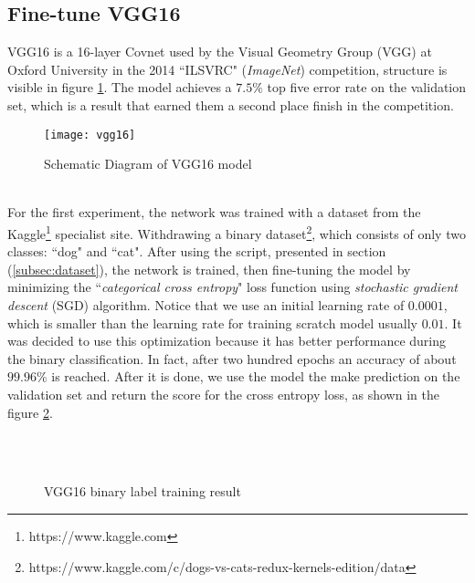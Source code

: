 \subsection{Fine-tune VGG16} 
\label{subsec:vgg16}
VGG16 is a 16-layer Covnet used by the Visual Geometry Group (VGG) at Oxford 
University in the 2014 ``ILSVRC" (\emph{ImageNet}) competition,
structure is visible in figure \ref{fig:vgg16schema}. 
The model achieves a $7.5\%$ top five error rate on the validation set, which 
is a result that earned them a second place finish in the competition.\linebreak
%
\begin{figure}[htb]
\centering
\texttt{[image: vgg16]}
\caption{Schematic Diagram of VGG16 model}
\label{fig:vgg16schema}
\end{figure}
%
\\\noindent For the first experiment, the network was trained with a dataset from 
the Kaggle\footnote{https://www.kaggle.com} specialist site. 
Withdrawing a binary 
dataset\footnote{https://www.kaggle.com/c/dogs-vs-cats-redux-kernels-edition/data}, 
which consists of only two classes: ``dog" and ``cat".
After using the script, presented in section (\ref{subsec:dataset}), the network
is trained, then fine-tuning the model by minimizing the ``\emph{categorical 
cross entropy}" loss function using \emph {stochastic gradient descent} (SGD) 
algorithm.
Notice that we use an initial learning
rate of $0.0001$, which is smaller than the learning rate for training scratch
model usually $0.01$.
It was decided to use this optimization because it has better performance 
during the binary classification.
In fact, after two hundred epochs an accuracy of about $99.96\%$ is reached. 
After it is done, we use the model the make prediction on the validation set 
and return the score for the cross entropy loss, as shown in the 
figure \ref{fig:vgg16resultbin}. \linebreak
\begin{figure}[htb]
\centering
{} \\\
\caption{VGG16 binary label training result}
\label{fig:vgg16resultbin}
\end{figure}
%
